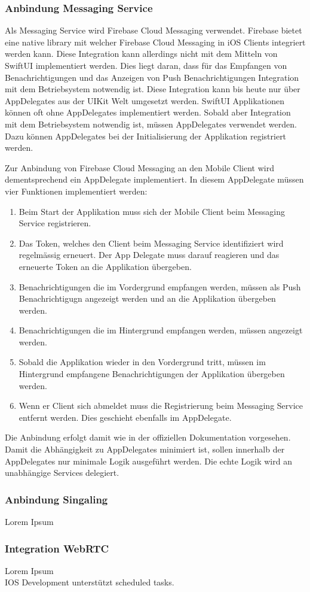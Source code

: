 \subsubsection{Anbindung Messaging Service}

Als Messaging Service wird Firebase Cloud Messaging verwendet.
Firebase bietet eine native library mit welcher Firebase Cloud Messaging in iOS Clients integriert werden kann.
Diese Integration kann allerdings nicht mit dem Mitteln von SwiftUI implementiert werden.
Dies liegt daran, dass für das Empfangen von Benachrichtigungen und das Anzeigen von Push Benachrichtigungen Integration mit dem Betriebsystem notwendig ist.
Diese Integration kann bis heute nur über AppDelegates aus der UIKit Welt umgesetzt werden.
SwiftUI Applikationen können oft ohne AppDelegates implementiert werden.
Sobald aber Integration mit dem Betriebsystem notwendig ist, müssen AppDelegates verwendet werden.
Dazu können AppDelegates bei der Initialisierung der Applikation registriert werden.

Zur Anbindung von Firebase Cloud Messaging an den Mobile Client wird dementsprechend ein AppDelegate implementiert.
In diesem AppDelegate müssen vier Funktionen implementiert werden:

\begin{enumerate}
    \item Beim Start der Applikation muss sich der Mobile Client beim Messaging Service registrieren.
    \item Das Token, welches den Client beim Messaging Service identifiziert wird regelmässig erneuert. Der App Delegate muss darauf reagieren und das erneuerte Token an die Applikation übergeben.
    \item Benachrichtigungen die im Vordergrund empfangen werden, müssen als Push Benachrichtigugn angezeigt werden und an die Applikation übergeben werden.
    \item Benachrichtigungen die im Hintergrund empfangen werden, müssen angezeigt werden.
    \item Sobald die Applikation wieder in den Vordergrund tritt, müssen im Hintergrund empfangene Benachrichtigungen der Applikation übergeben werden.
    \item Wenn er Client sich abmeldet muss die Registrierung beim Messaging Service entfernt werden. Dies geschieht ebenfalls im AppDelegate.
\end{enumerate}




Die Anbindung erfolgt damit wie in der offiziellen Dokumentation vorgesehen.
Damit die Abhängigkeit zu AppDelegates minimiert ist, sollen innerhalb der AppDelegates nur minimale Logik ausgeführt werden.
Die echte Logik wird an unabhängige Services delegiert.


\subsubsection{Anbindung Singaling}

Lorem Ipsum\\

\subsubsection{Integration WebRTC}

Lorem Ipsum\\


IOS Development unterstützt scheduled tasks.

\clearpage
